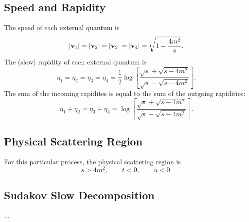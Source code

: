 \subsection{Speed and Rapidity}
The speed of each external quantum is
\begin{equation}
	\left\lvert \mathbf{v}_{1} \right\rvert = \left\lvert \mathbf{v}_{2} \right\rvert = \left\lvert \mathbf{v}_{3} \right\rvert = \left\lvert \mathbf{v}_{4} \right\rvert = \sqrt{1 - \frac{4 m^{2}}{s}}.
\end{equation}
The (slow) rapidity of each external quantum is
\begin{equation}
	\eta_{1} = \eta_{2} = \eta_{3} = \eta_{4} = \frac{1}{2} \log{\left[\frac{\sqrt{s} + \sqrt{s - 4 m^{2}}}{\sqrt{s} - \sqrt{s - 4 m^{2}}}\right]}.
\end{equation}
The sum of the incoming rapidites is equal to the sum of the outgoing rapidities:
\begin{equation}
	\eta_{1} + \eta_{2} = \eta_{3} + \eta_{4} = \log{\left[\frac{\sqrt{s} + \sqrt{s - 4 m^{2}}}{\sqrt{s} - \sqrt{s - 4 m^{2}}}\right]}.
\end{equation}
\subsection{Physical Scattering Region}
For this particular process, the physical scattering region is
\begin{equation}
	s > 4m^2, \qquad t < 0, \qquad u < 0.
\end{equation}
\subsection{Sudakov Slow Decomposition}
...

